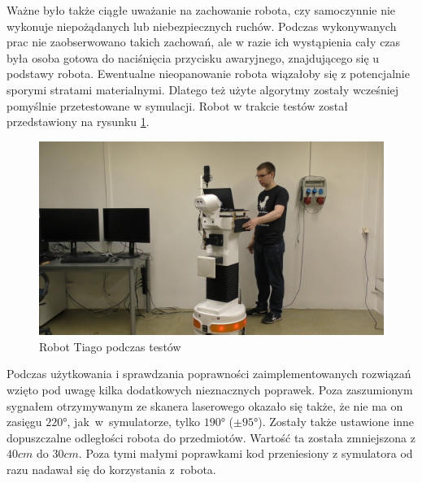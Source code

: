 Ważne było także ciągłe uważanie na zachowanie robota, czy samoczynnie nie wykonuje niepożądanych lub niebezpiecznych ruchów. Podczas wykonywanych prac nie zaobserwowano takich zachowań, ale w razie ich wystąpienia cały czas była osoba gotowa do naciśnięcia przycisku awaryjnego, znajdującego się u podstawy robota. Ewentualne nieopanowanie robota wiązałoby się z potencjalnie sporymi stratami materialnymi. Dlatego też użyte algorytmy zostały wcześniej pomyślnie przetestowane w symulacji. Robot w trakcie testów został przedstawiony na rysunku \ref{f_test_robot_1}.

\begin{figure}[!h]
    \centering 
    \includegraphics[width=0.95\linewidth]{img/test_robot_1.jpg}
    \caption{Robot Tiago podczas testów}
    \label{f_test_robot_1}
\end{figure}

Podczas użytkowania i sprawdzania poprawności zaimplementowanych rozwiązań wzięto pod uwagę kilka dodatkowych nieznacznych poprawek. Poza zaszumionym sygnałem otrzymywanym ze skanera laserowego okazało się także, że nie ma on zasięgu $\ang{220}$, jak~w~symulatorze, tylko $\ang{190}$ ($\pm\ang{95}$). Zostały także ustawione inne dopuszczalne odległości robota do przedmiotów. Wartość ta została zmniejszona z $40cm$ do $30cm$. Poza tymi małymi poprawkami kod przeniesiony z symulatora od razu nadawał się do korzystania z~robota.

